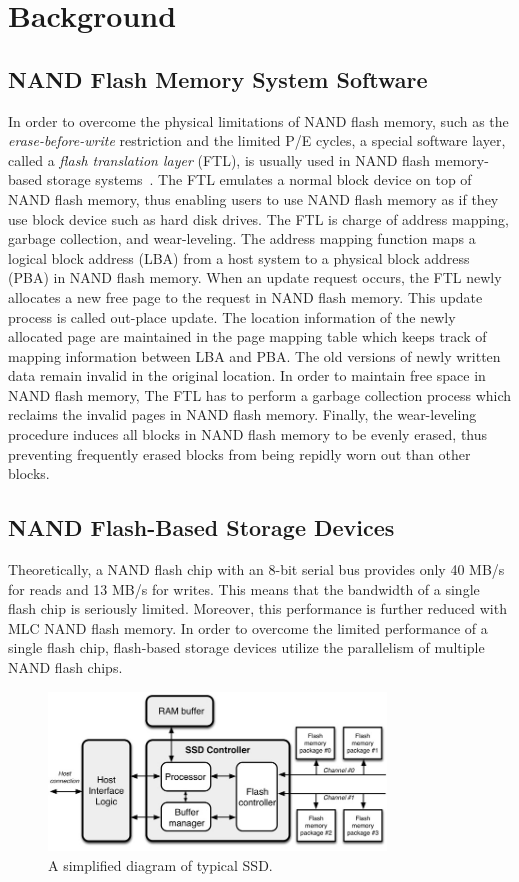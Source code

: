 \chapter{Background}
\label{chap:Background}


\section{NAND Flash Memory System Software}
In order to overcome the physical limitations of NAND flash memory,
such as the {\it erase-before-write} restriction and the limited P/E cycles,
a special software layer, called a {\it flash translation layer} (FTL), is usually
used in NAND flash memory-based storage systems~\cite{FTL}.
The FTL emulates a normal block device on top of NAND flash memory, thus enabling 
users to use NAND flash memory as if they use block device such as hard disk drives.
The FTL is charge of address mapping, garbage collection, and wear-leveling.
The address mapping function maps a logical block address (LBA) from a host system
to a physical block address (PBA) in NAND flash memory. 
When an update request occurs, the FTL newly allocates a new free page to the request
in NAND flash memory. This update process is called out-place update. 
The location information of the newly allocated page are maintained in the page mapping table
which keeps track of mapping information between LBA and PBA. The old versions of newly written
data remain invalid in the original location. In order to maintain free space in NAND flash memory,
The FTL has to perform a garbage collection process which reclaims the invalid pages in NAND
flash memory. Finally, the wear-leveling procedure induces all blocks in NAND flash memory 
to be evenly erased, thus preventing frequently erased blocks from being repidly worn out
than other blocks.


\section{NAND Flash-Based Storage Devices}
Theoretically, a NAND flash chip with an 8-bit serial bus provides only 40 MB/s for reads
and 13 MB/s for writes. This means that the bandwidth of a single flash chip is seriously 
limited. Moreover, this performance is further reduced with MLC NAND flash memory. 
In order to overcome the limited performance of a single flash chip, flash-based storage 
devices utilize the parallelism of multiple NAND flash chips.

\begin{figure}[b]
	\centering
	\includegraphics[width=0.8\textwidth]{figure/background/ssd_arch}
	\caption{A simplified diagram of typical SSD.}
	\label{fig:ssd_arch}
\end{figure}

